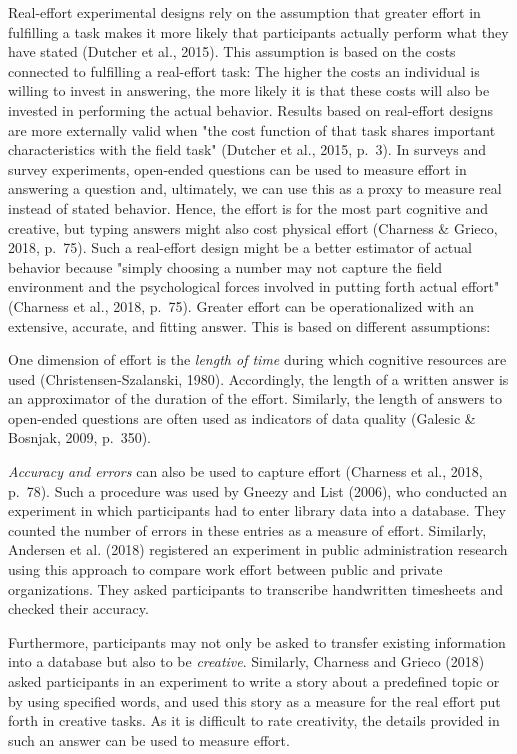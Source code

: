 \documentclass{article}
\begin{document}
Real-effort experimental designs rely on the assumption that greater effort in fulfilling a task makes it more likely that participants actually perform what they have stated (Dutcher et al., 2015). This assumption is based on the costs connected to fulfilling a real-effort task: The higher the costs an individual is willing to invest in answering, the more likely it is that these costs will also be invested in performing the actual behavior. Results based on real-effort designs are more externally valid when "the cost function of that task shares important characteristics with the field task" (Dutcher et al., 2015, p. 3). In surveys and survey experiments, open-ended questions can be used to measure effort in answering a question and, ultimately, we can use this as a proxy to measure real instead of stated behavior. Hence, the effort is for the most part cognitive and creative, but typing answers might also cost physical effort (Charness \& Grieco, 2018, p. 75). Such a real-effort design might be a better estimator of actual behavior because "simply choosing a number may not capture the field environment and the psychological forces involved in putting forth actual effort" (Charness et al., 2018, p. 75). Greater effort can be operationalized with an extensive, accurate, and fitting answer. This is based on different assumptions: 

One dimension of effort is the \emph{length of time} during which cognitive resources are used (Christensen-Szalanski, 1980). Accordingly, the length of a written answer is an approximator of the duration of the effort. Similarly, the length of answers to open-ended questions are often used as indicators of data quality (Galesic \& Bosnjak, 2009, p. 350). 

\emph{Accuracy and errors} can also be used to capture effort (Charness et al., 2018, p. 78). Such a procedure was used by Gneezy and List (2006), who conducted an experiment in which participants had to enter library data into a database. They counted the number of errors in these entries as a measure of effort. Similarly, Andersen et al. (2018) registered an experiment in public administration research using this approach to compare work effort between public and private organizations. They asked participants to transcribe handwritten timesheets and checked their accuracy. 

Furthermore, participants may not only be asked to transfer existing information into a database but also to be \emph{creative}. Similarly, Charness and Grieco (2018) asked participants in an experiment to write a story about a predefined topic or by using specified words, and used this story as a measure for the real effort put forth in creative tasks. As it is difficult to rate creativity, the details provided in such an answer can be used to measure effort.
\end{document}
